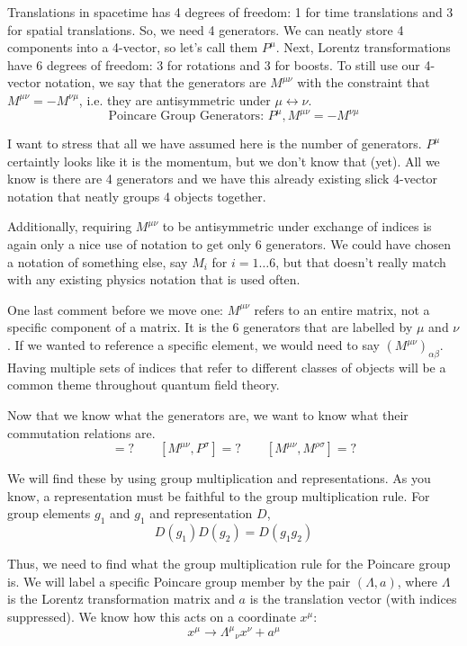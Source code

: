 \documentclass[12pt]{article}
\begin{document}
Translations in spacetime has 4 degrees of freedom: 1 for time translations and 3 for spatial translations. So, we need 4 generators. We can neatly store 4 components into a 4-vector, so let's call them $P^\mu$. Next, Lorentz transformations have 6 degrees of freedom: 3 for rotations and 3 for boosts. To still use our 4-vector notation, we say that the generators are $M^{\mu\nu}$ with the constraint that $M^{\mu\nu}=-M^{\nu\mu}$, i.e. they are antisymmetric under $\mu\leftrightarrow\nu$.
\begin{equation}
    \text{Poincare Group Generators: } P^\mu, M^{\mu\nu}=-M^{\nu\mu}
\end{equation}

I want to stress that all we have assumed here is the number of generators. $P^\mu$ certaintly looks like it is the momentum, but we don't know that (yet). All we know is there are 4 generators and we have this already existing slick 4-vector notation that neatly groups 4 objects together.

Additionally, requiring $M^{\mu\nu}$ to be antisymmetric under exchange of indices is again only a nice use of notation to get only 6 generators. We could have chosen a notation of something else, say $M_i$ for $i=1\dots6$, but that doesn't really match with any existing physics notation that is used often.

One last comment before we move one: $M^{\mu\nu}$ refers to an entire matrix, not a specific component of a matrix. It is the 6 generators that are labelled by $\mu$ and $\nu$. If we wanted to reference a specific element, we would need to say $(M^{\mu\nu})_{\alpha\beta}$. Having multiple sets of indices that refer to different classes of objects will be a common theme throughout quantum field theory.

Now that we know what the generators are, we want to know what their commutation relations are.
\begin{equation}
    [P^\mu,P^\nu]=\text{?}\qquad[M^{\mu\nu},P^\sigma]=\text{?}\qquad[M^{\mu\nu},M^{\rho\sigma}]=\text{?}
\end{equation}

We will find these by using group multiplication and representations. As you know, a representation must be faithful to the group multiplication rule. For group elements $g_1$ and $g_1$ and representation $D$,
\begin{equation}
    D(g_1)D(g_2)=D(g_1g_2)
\end{equation}

Thus, we need to find what the group multiplication rule for the Poincare group is. We will label a specific Poincare group member by the pair $(\Lambda,a)$, where $\Lambda$ is the Lorentz transformation matrix and $a$ is the translation vector (with indices suppressed). We know how this acts on a coordinate $x^\mu$:
\begin{equation}
    x^\mu\rightarrow{\Lambda^\mu}_\nu x^\nu+a^\mu
\end{equation}
\end{document}
